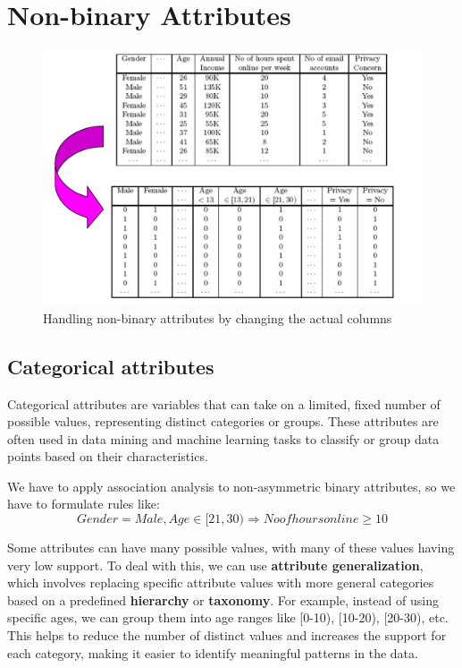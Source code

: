 \section{Non-binary Attributes}

\begin{figure}[htbp]
   \centering
   \includegraphics{images/08/nonbinary.png}
   \caption{Handling non-binary attributes by changing the actual columns}
   \label{fig:08/nonbinary}
\end{figure}

\subsection{Categorical attributes}
Categorical attributes are variables that can take on a limited, fixed number of possible values, representing distinct categories or groups. These attributes are often used in data mining and machine learning tasks to classify or group data points based on their characteristics.

We have to apply association analysis to non-asymmetric binary attributes, so we have to formulate rules like:
\[
   {Gender=Male, Age \in [21,30)} \Rightarrow {No of hours online \geq 10}
\]

Some attributes can have many possible values, with many of these values having very low support. To deal with this, we can use \textbf{attribute
generalization}, which involves replacing specific attribute values with more general categories based on a predefined \textbf{hierarchy} or \textbf{taxonomy}.
For example, instead of using specific ages, we can group them into age ranges like [0-10), [10-20), [20-30), etc. This helps to reduce the number of distinct values and increases the support for each category, making it easier to identify meaningful patterns in the data.

